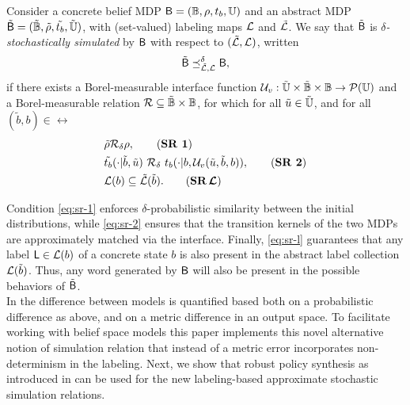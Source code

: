 \documentclass{ifacconf}
\begin{document}
\begin{definition}
\label{def:apbsim}
Consider a concrete belief MDP $\mathsf{B} = (\mathbb{B}, \rho, t_b, {\mathbb{U}})$ and an abstract MDP $\tilde{\mathsf{B}} = (\tilde {\mathbb{B}}, \tilde \rho, \tilde {t_b}, \tilde {{\mathbb{U}}})$, with (set-valued) labeling maps $\mathcal{L}$ and  $\tilde{\mathcal{L}}$. We say that	$\tilde {\mathsf{B}}$ is \emph{$\delta$-stochastically simulated} by $ \mathsf{B}$ with respect to $(\tilde{\mathcal{L}},\mathcal{L})$, written
\begin{equation}
 \tilde {\mathsf{B}}\preceq^{\delta}_{\tilde{\mathcal{L}},\mathcal{L}}  \mathsf{B},
\end{equation}
if there exists a Borel-measurable interface function $\mathcal{U}_{v} : \tilde {{\mathbb{U}}} \times \tilde {\mathbb{B}} \times \mathbb{B} \rightarrow \mathcal P({\mathbb{U}})$ and a Borel-measurable relation $\mathcal{R}\subseteq \tilde {\mathbb{B}}\times \mathbb{B}$, for which for all  $ \tilde u\in \tilde {{\mathbb{U}}}$, and for all $ (\tilde b,b)\in \rel$
\begin{align}
  \label{eq:sr-1} & \tilde\init \bar \rel_\delta \init, \tag{\textbf{SR 1}} \\
  \label{eq:sr-2} &  \tilde \trb(\cdot| \tilde b, \tilde u)\ \bar \rel_\delta \  \trb(\cdot| b, \InF(\tilde u,\tilde b,b)), \tag{\textbf{SR 2}} \\
  \label{eq:sr-l} & %
   \Labset(b)\subseteq \tilde{\Labset}(\tilde b).\tag{\textbf{SR$\,\boldsymbol{\CA{L}}$}}
\end{align}

\end{definition}

Condition \eqref{eq:sr-1} enforces $\delta$-probabilistic similarity between the initial distributions, while \eqref{eq:sr-2} ensures that the transition kernels of the two MDPs are approximately matched via the interface. Finally, \eqref{eq:sr-l} guarantees that any label $\mathsf{L} \in \mathcal{L}(b)$ of a concrete state $b$ is also present in the abstract label collection $\mathcal{L}(\tilde b)$. Thus, any word generated by $\mathsf{B}$ will also be present in the possible behaviors of $\tilde {\mathsf{B}}$.
\\
In \citet{haesaert2017verification} the difference between models is quantified based both on a probabilistic difference as above, and on a metric difference in an output space. To facilitate working with belief space models this paper implements this novel alternative notion of simulation relation that instead of a metric error incorporates non-determinism in the labeling.
Next, we show that robust policy synthesis as introduced in \cite{tech_report_TACAS} can be used for the new labeling-based approximate stochastic simulation relations.
\end{document}
